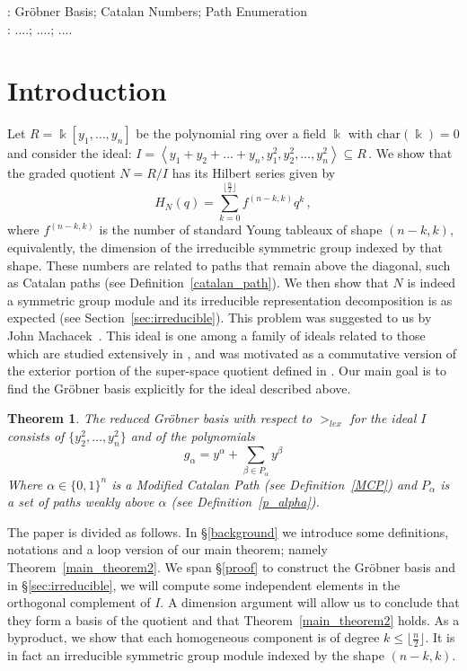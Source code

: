 \documentclass[10pt,a4paper]{article}
\newtheorem{theorem}{Theorem}[section]
\def\field{\Bbbk}
\DeclareMathOperator{\la}{\langle}
\DeclareMathOperator{\ra}{\rangle}
\begin{document}
\bigskip

: Gr\"obner Basis; Catalan Numbers; Path Enumeration\\
: ....; ....; .... 

\section{Introduction} 
Let $R = \field[y_1, \dots, y_n]$ be the polynomial ring over a field $\field$ with $\text{char}( \field) = 0$ and consider the ideal:
$I = \la y_1 + y_2 + \dots + y_n, y^2_1, y^2_2, \dots , y^2_n \ra \subseteq R\,.$
We show that the graded quotient $N = R /I$ has its Hilbert series given by 
$$H_N(q)=\sum_{k=0}^{\lfloor \frac{n}{2} \rfloor } f^{(n-k,k)}q^k\,,$$
 where $f^{(n-k,k)}$ is the number of standard Young tableaux of shape $(n-k,k)$, equivalently, the dimension of the irreducible symmetric group indexed by that shape. 
 These numbers are related to paths that remain above the diagonal, such as Catalan paths (see Definition~\ref{catalan_path}).
 We then show that $N$ is indeed a symmetric group module and
its irreducible representation decomposition is as expected (see Section~\ref{sec:irreducible}). This problem was suggested to us by John Machacek~\cite{M}.
This ideal is one among a family of ideals related to those which are studied extensively in \cite{HRS}, and was motivated as a commutative version of the exterior portion of the super-space quotient defined in \cite{Z}. Our main goal is to find the Gr\"obner basis explicitly for the ideal described above.  
\begin{theorem} \label{main_theorem}
	 The reduced Gr\"obner basis with respect to $>_{lex}$ for the ideal $I$ consists of $\{y_2^2, \dots, y_n^2\}$ and of the polynomials
	\begin{equation} \label{main_theorem_eqn}
		g_{\alpha} = y^{\alpha} + \sum_{\beta \in P_{\alpha}} y^{\beta}
	\end{equation}
	Where $\alpha \in \{0,1\}^n$ is a Modified Catalan Path (see Definition~\ref{MCP}) and $P_\alpha$ is a set of paths weakly above $\alpha$ (see Definition~\ref{p_alpha}). \end{theorem}
The   paper is divided as follows. In \S\ref{background}  we introduce some definitions, notations and a loop version of our main theorem; namely Theorem~\ref{main_theorem2}. 
We span \S\ref{proof} to construct the Gr\"obner basis and in \S\ref{sec:irreducible}, we will compute some independent elements in the orthogonal complement of $I$. A dimension argument will allow us to conclude that they form a basis of the quotient and that Theorem~\ref{main_theorem2} holds. As a byproduct, we show that each homogeneous component is of degree $k\le {\lfloor \frac{n}{2} \rfloor }$. It is in fact  an irreducible  symmetric group module indexed by the shape $(n-k,k)$.
\end{document}
